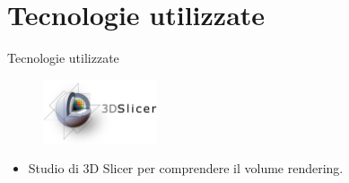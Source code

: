 \documentclass{beamer}
\begin{document}
	\section{Tecnologie utilizzate}
	\begin{frame}{Tecnologie utilizzate}
	
	\begin{figure}[ht]
    	\centering
    	\includegraphics[width=0.3\textwidth]{Images/logo3dslicer.png}
	\end{figure}
	
	\begin{itemize}
		\item Studio di 3D Slicer per comprendere il volume rendering.
	\end{itemize}


\end{frame}
\end{document}
